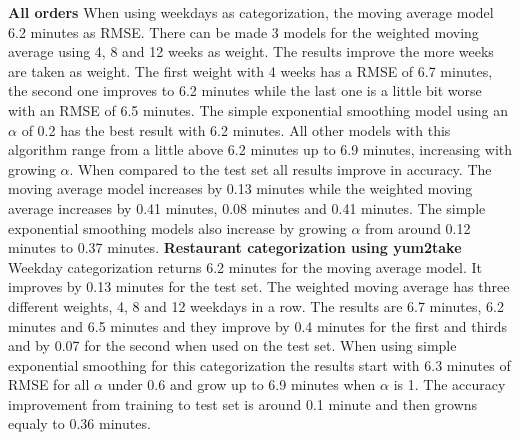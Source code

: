 \newline\newline\textbf{All orders}\newline
When using weekdays as categorization, the moving average model 6.2 minutes as RMSE. There can be made 3 models for the weighted moving average using 4, 8 and 12 weeks as weight. The results improve the more weeks are taken as weight. The first weight with 4 weeks has a RMSE of 6.7 minutes, the second one improves to 6.2 minutes while the last one is a little bit worse with an RMSE of 6.5 minutes. The simple exponential smoothing model using an $\alpha$ of 0.2 has the best result with 6.2 minutes. All other models with this algorithm range from a little above 6.2 minutes up to 6.9 minutes, increasing with growing $\alpha$. When compared to the test set all results improve in accuracy. The moving average model increases by 0.13 minutes while the weighted moving average increases by 0.41 minutes, 0.08 minutes and 0.41 minutes. The simple exponential smoothing models also increase by growing $\alpha$ from around 0.12 minutes to 0.37 minutes.
\newline\newline\textbf{Restaurant categorization using yum2take}\newline
Weekday categorization returns 6.2 minutes for the moving average model. It improves by 0.13 minutes for the test set. The weighted moving average has three different weights, 4, 8 and 12 weekdays in a row. The results are 6.7 minutes, 6.2 minutes and 6.5 minutes and they improve by 0.4 minutes for the first and thirds and by 0.07 for the second when used on the test set. When using simple exponential smoothing for this categorization the results start with 6.3 minutes of RMSE for all $\alpha$ under 0.6 and grow up to 6.9 minutes when $\alpha$ is 1. The accuracy improvement from training to test set is around 0.1 minute and then growns equaly to 0.36 minutes.

